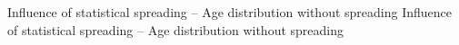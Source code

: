 {}


\createfigure%
{Influence of statistical spreading -- Age distribution without spreading}%
{Influence of statistical spreading -- Age distribution without spreading}%
{\label{fig:statisticalSpreadingAgeDistribution}}%
